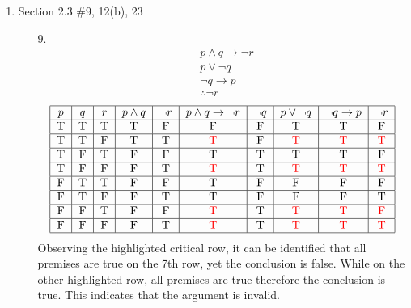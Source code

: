 \documentclass[12pt]{article}
\newcommand{\redt}{\textcolor{red}{T}}
\newcommand{\redf}{\textcolor{red}{F}}
\begin{document}
    \begin{enumerate}
    
        \item Section 2.3 \#9, 12(b), 23
            \begin{enumerate}
                \item[9.]
                    \begin{align*}
                        & p \wedge q \rightarrow \neg r \\
                        & p \vee \neg q\\
                        & \neg q \rightarrow p\\
                        & \therefore \neg r
                    \end{align*}
                    \[
                        \begin{tabular}{|c|c|c|c|c|c|c|c|c|c|}
                        \hline
                        $p$ & $q$ & $r$ & $p \wedge q$ & $\neg r$ & $p \wedge q \rightarrow \neg r$ & $\neg q$ & $p \vee \neg q$ & $\neg q \rightarrow p$ & $\neg r$ \\
                        \hline
                        T & T & T & T & F & F & F & T & T & F \\
                        \hline
                        T & T & F & T & T & \redt & F & \redt & \redt & \redt \\
                        \hline
                        T & F & T & F & F & T & T & T & T & F \\
                        \hline
                        T & F & F & F & T & \redt & T & \redt & \redt & \redt \\
                        \hline
                        F & T & T & F & F & T & F & F & F & F \\
                        \hline
                        F & T & F & F & T & T & F & F & F & T \\
                        \hline
                        F & F & T & F & F & \redt & T & \redt & \redt & \redf \\
                        \hline
                        F & F & F & F & T & \redt & T & \redt & \redt & \redt \\
                        \hline
                        \end{tabular}
                    \]
                Observing the highlighted critical row, it can be identified that all premises are true on the 7th row, yet the conclusion is false. While on the other highlighted row, all premises are true therefore the conclusion is true. This indicates that the argument is invalid. 



\end{enumerate}
\end{enumerate}
\end{document}

